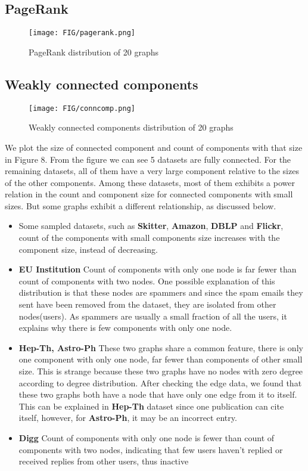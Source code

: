 \subsection{PageRank}
\begin{figure}[H]
\begin{center}
\texttt{[image: FIG/pagerank.png]}
\caption{PageRank distribution of 20 graphs}
\end{center}
\end{figure}



\subsection{Weakly connected components}
\begin{figure}[H]
\begin{center}
\texttt{[image: FIG/conncomp.png]}
\caption{Weakly connected components distribution of 20 graphs}
\end{center}
\end{figure}

We plot the size of connected component and count of components with that size in Figure 8. From the figure we can see 5 datasets are fully connected. For the remaining datasets, all of them have a very large component relative to the sizes of the other components. Among these datasets, most of them exhibits a power relation in the count and component size for connected components with small sizes. But some graphs exhibit a different relationship, as discussed below.

\begin{itemize}
\item Some sampled datasets, such as \textbf{Skitter}, \textbf{Amazon}, \textbf{DBLP} and \textbf{Flickr}, count of the components with small components size increases with the component size, instead of decreasing.
\item \textbf{EU Institution} Count of components with only one node is far fewer than count of components with two nodes. One possible explanation of this distribution is that these nodes are spammers and since the spam emails they sent have been removed from the dataset, they are isolated from other nodes(users). As spammers are usually a small fraction of all the users, it explains why there is few components with only one node.
\item \textbf{Hep-Th, Astro-Ph} These two graphs share a common feature, there is only one component with only one node, far fewer than components of other small size. This is strange because these two graphs have no nodes with zero degree according to degree distribution. After checking the edge data, we found that these two graphs both have a node that have only one edge from it to itself. This can be explained in \textbf{Hep-Th} dataset since one publication can cite itself, however, for \textbf{Astro-Ph}, it may be an incorrect entry.
\item \textbf{Digg} Count of components with only one node is fewer than count of components with two nodes, indicating that few users haven't replied or received replies from other users, thus inactive 
\end{itemize}


